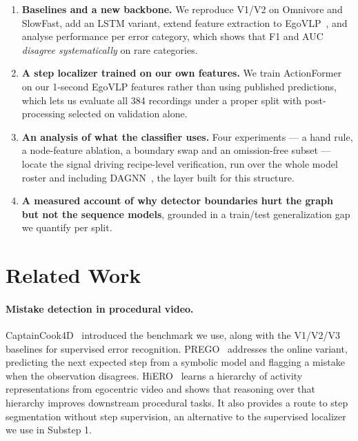 \documentclass[10pt,twocolumn,letterpaper]{article}
\begin{document}
\begin{enumerate}
\itemsep0.15em
\item \textbf{Baselines and a new backbone.} We reproduce V1/V2 on Omnivore and
SlowFast, add an LSTM variant, extend feature extraction to
EgoVLP~\cite{lin2022egovlp}, and analyse performance per error category, which
shows that F1 and AUC \emph{disagree systematically} on rare categories.

\item \textbf{A step localizer trained on our own features.} We train
ActionFormer~\cite{zhang2022actionformer} on our 1-second EgoVLP features rather
than using published predictions, which lets us evaluate all 384 recordings under
a proper split with post-processing selected on validation alone.

\item \textbf{An analysis of what the classifier uses.} Four experiments --- a
hand rule, a node-feature ablation, a boundary swap and an omission-free subset
--- locate the signal driving recipe-level verification, run over the whole model
roster and including DAGNN~\cite{thost2021dagnn}, the layer built for this
structure.

\item \textbf{A measured account of why detector boundaries hurt the graph but not
the sequence models}, grounded in a train/test generalization gap we quantify per
split.
\end{enumerate}

\section{Related Work}

\paragraph{Mistake detection in procedural video.}
CaptainCook4D~\cite{peddi2024captaincook4d} introduced the benchmark we use, along
with the V1/V2/V3 baselines for supervised error recognition. PREGO~\cite{flaborea2024prego}
addresses the online variant, predicting the next expected step from a symbolic
model and flagging a mistake when the observation disagrees.
HiERO~\cite{peirone2025hiero} learns a hierarchy of activity representations from
egocentric video and shows that reasoning over that hierarchy improves downstream
procedural tasks. It also provides a route to step segmentation without step
supervision, an alternative to the supervised localizer we use in Substep 1.
\end{document}
